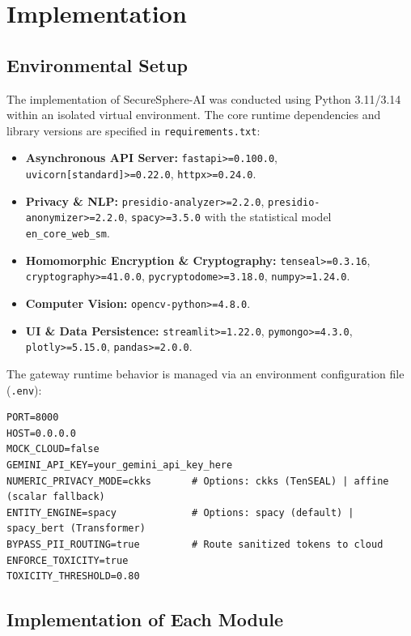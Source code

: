 \chapter{Implementation}

\section{Environmental Setup}
The implementation of SecureSphere-AI was conducted using Python 3.11/3.14 within an isolated virtual environment. The core runtime dependencies and library versions are specified in \texttt{requirements.txt}:
\begin{itemize}[leftmargin=*]
    \item \textbf{Asynchronous API Server:} \texttt{fastapi>=0.100.0}, \texttt{uvicorn[standard]>=0.22.0}, \texttt{httpx>=0.24.0}.
    \item \textbf{Privacy \& NLP:} \texttt{presidio-analyzer>=2.2.0}, \texttt{presidio-anonymizer>=2.2.0}, \texttt{spacy>=3.5.0} with the statistical model \texttt{en\_core\_web\_sm}.
    \item \textbf{Homomorphic Encryption \& Cryptography:} \texttt{tenseal>=0.3.16}, \texttt{cryptography>=41.0.0}, \texttt{pycryptodome>=3.18.0}, \texttt{numpy>=1.24.0}.
    \item \textbf{Computer Vision:} \texttt{opencv-python>=4.8.0}.
    \item \textbf{UI \& Data Persistence:} \texttt{streamlit>=1.22.0}, \texttt{pymongo>=4.3.0}, \texttt{plotly>=5.15.0}, \texttt{pandas>=2.0.0}.
\end{itemize}

The gateway runtime behavior is managed via an environment configuration file (\texttt{.env}):
\begin{verbatim}
PORT=8000
HOST=0.0.0.0
MOCK_CLOUD=false
GEMINI_API_KEY=your_gemini_api_key_here
NUMERIC_PRIVACY_MODE=ckks       # Options: ckks (TenSEAL) | affine (scalar fallback)
ENTITY_ENGINE=spacy             # Options: spacy (default) | spacy_bert (Transformer)
BYPASS_PII_ROUTING=true         # Route sanitized tokens to cloud
ENFORCE_TOXICITY=true
TOXICITY_THRESHOLD=0.80
\end{verbatim}

\section{Implementation of Each Module}

